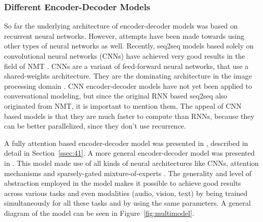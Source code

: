 \documentclass[12pt]{article}
\begin{document}
\subsubsection{Different Encoder-Decoder Models} \label{sssec:diffencdec}
So far the underlying architecture of encoder-decoder models was based on recurrent neural networks. However, attempts have been made towards using other types of neural networks as well. Recently, seq2seq models based solely on convolutional neural networks (CNNs) have achieved very good results in the field of NMT \cite{Kaiser:2016,Kaiser:2017,ByteNet:2016,ConvS2S:2017}. CNNs are a variant of feed-forward neural networks, that use a shared-weights architecture. They are the dominating architecture in the image processing domain \cite{Imagenet:2012}. CNN encoder-decoder models have not yet been applied to conversational modeling, but since the original RNN based seq2seq also originated from NMT, it is important to mention them. The appeal of CNN based models is that they are much faster to compute than RNNs, because they can be better parallelized, since they don't use recurrence.

A fully attention based encoder-decoder model was presented in \cite{Vaswani:2017}, described in detail in Section~\ref{ssec:41}. A more general encoder-decoder model was presented in \cite{Kaiser_one_model:2017}. This model made use of all kinds of neural architectures like CNNs, attention mechanisms and sparsely-gated mixture-of-experts \cite{MoE:2017}. The generality and level of abstraction employed in the model makes it possible to achieve good results across various tasks and even modalities (audio, vision, text) by being trained simultaneously for all these tasks and by using the same parameters. A general diagram of the model can be seen in Figure~\ref{fig:multimodel}. 
\end{document}
